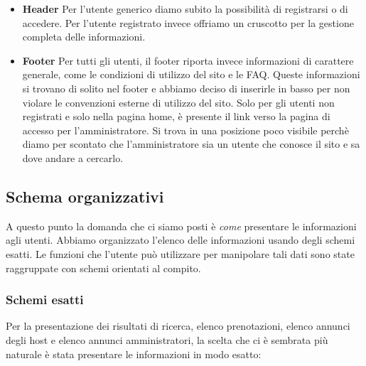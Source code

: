 \documentclass[1_relazione.tex]{subfiles}
\begin{document}
\begin{itemize}
\item \textbf{Header}
Per l'utente generico diamo subito la possibilit\`{a} di registrarsi o di accedere. Per l'utente registrato invece offriamo un cruscotto per la gestione completa delle informazioni.
\item \textbf{Footer}
Per tutti gli utenti, il footer riporta invece informazioni di carattere generale, come le condizioni di utilizzo del sito e le FAQ. Queste informazioni si trovano di solito nel footer e abbiamo deciso di inserirle in basso per non violare le convenzioni esterne di utilizzo del sito.  Solo per gli utenti non registrati e solo nella pagina home, \`{e} presente il link verso la pagina di accesso per l'amministratore. Si trova in una posizione poco visibile perch\`{e} diamo per scontato che l'amministratore sia un utente che conosce il sito e sa dove andare a cercarlo.
\end{itemize}


\subsection{Schema organizzativi}
A questo punto la domanda che ci siamo posti \`{e} \textit{come} presentare le informazioni agli utenti. Abbiamo organizzato l'elenco delle informazioni usando degli schemi esatti. Le funzioni che l'utente pu\`{o} utilizzare per manipolare tali dati sono state raggruppate con schemi orientati al compito.

\subsubsection{Schemi esatti}
Per la presentazione dei risultati di ricerca, elenco prenotazioni,  elenco annunci degli host e elenco annunci amministratori, la scelta che ci \`{e} sembrata pi\`{u} naturale \`{e} stata presentare le informazioni in modo esatto:
\end{document}
